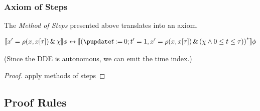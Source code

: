 \documentclass[10pt]{article}
\begin{document}
        \subsubsection{Axiom of Steps}
            \label{sec:axiom-of-steps}
            The \emph{Method of Steps} presented above translates into an axiom.

            \begin{equation}
                \dbox[]{\hevolvein{x'=\rho(x,\xtau)}{\chi}}{\phi}
                \lbisubjunct
                \dbox[]{\prepeat{(\hupdate{\humod{t}{0}};\hevolvein{t'=1\syssep x'=\rho(x,\xtau)}{(\chi\land 0\leq t\leq\tau)})}}{\phi}
            \end{equation}

            (Since the DDE is autonomous, we can emit the time index.)

            \begin{proof}
                apply methods of steps
            \end{proof}

    \subsection{Proof Rules}
        \label{sec:proof-rules}
\end{document}
